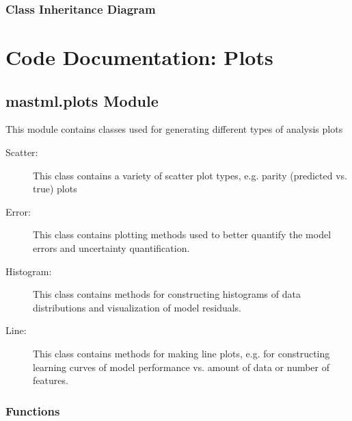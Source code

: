 \documentclass[letterpaper,10pt,english]{sphinxmanual}
\begin{document}
\subsection{Class Inheritance Diagram}
\label{\detokenize{11_models:class-inheritance-diagram}}


\chapter{Code Documentation: Plots}
\label{\detokenize{12_plots:code-documentation-plots}}\label{\detokenize{12_plots::doc}}

\section{mastml.plots Module}
\label{\detokenize{12_plots:module-mastml.plots}}\label{\detokenize{12_plots:mastml-plots-module}}
This module contains classes used for generating different types of analysis plots
\begin{description}
\item[{Scatter:}] \leavevmode
This class contains a variety of scatter plot types, e.g. parity (predicted vs. true) plots

\item[{Error:}] \leavevmode
This class contains plotting methods used to better quantify the model errors and uncertainty quantification.

\item[{Histogram:}] \leavevmode
This class contains methods for constructing histograms of data distributions and visualization of model residuals.

\item[{Line:}] \leavevmode
This class contains methods for making line plots, e.g. for constructing learning curves of model performance vs.
amount of data or number of features.

\end{description}


\subsection{Functions}
\label{\detokenize{12_plots:functions}}
\end{document}
